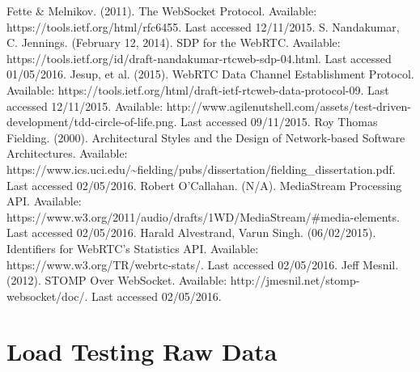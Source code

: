 \documentclass[]{report}
\begin{document}
\begin{thebibliography}{20}
		Fette \& Melnikov. (2011). The WebSocket Protocol. Available: https://tools.ietf.org/html/rfc6455. Last accessed 12/11/2015.
		S. Nandakumar, C. Jennings. (February 12, 2014). SDP for the WebRTC. Available: https://tools.ietf.org/id/draft-nandakumar-rtcweb-sdp-04.html. Last accessed 01/05/2016.
		Jesup, et al. (2015). WebRTC Data Channel Establishment Protocol. Available: https://tools.ietf.org/html/draft-ietf-rtcweb-data-protocol-09. Last accessed 12/11/2015.
		Available: http://www.agilenutshell.com/assets/test-driven-development/tdd-circle-of-life.png. Last accessed 09/11/2015.
		Roy Thomas Fielding. (2000). Architectural Styles and the Design of Network-based Software Architectures. Available: https://www.ics.uci.edu/\textasciitilde{}fielding/pubs/dissertation/fielding\_dissertation.pdf. Last accessed 02/05/2016.
		Robert O'Callahan. (N/A). MediaStream Processing API. Available: https://www.w3.org/2011/audio/drafts/1WD/MediaStream/\#media-elements. Last accessed 02/05/2016.
		Harald Alvestrand, Varun Singh. (06/02/2015). Identifiers for WebRTC's Statistics API. Available: https://www.w3.org/TR/webrtc-stats/. Last accessed 02/05/2016.
		Jeff Mesnil. (2012). STOMP Over WebSocket. Available: http://jmesnil.net/stomp-websocket/doc/. Last accessed 02/05/2016.
		
	\end{thebibliography}
	
	\appendix
	\chapter{Load Testing Raw Data}
	
\end{document}
